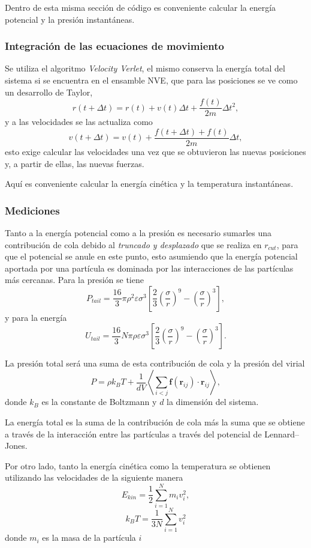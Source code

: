 \documentclass[a4paper,spanish,12pt,twoside]{article}
\begin{document}
Dentro de esta misma sección de código es conveniente calcular la energía potencial y la presión instantáneas. 

\subsubsection{Integración de las ecuaciones de movimiento}

Se utiliza el algoritmo \textit{Velocity Verlet}, el mismo conserva la energía total del sistema si se encuentra en el ensamble NVE, que para las posiciones se ve como un desarrollo de Taylor,
$$
r(t + \Delta t) = r(t) + v(t) \Delta t + \frac{f(t)}{2m} \Delta t^2,
$$
y a las velocidades se las actualiza como
$$
v(t + \Delta t) = v(t) + \frac{f(t + \Delta t) + f(t)}{2m} \Delta t,
$$
esto exige calcular las velocidades una vez que se obtuvieron las nuevas posiciones y, a partir de ellas, las nuevas fuerzas.

Aquí es conveniente calcular la energía cinética y la temperatura instantáneas.

\subsubsection{Mediciones}

Tanto a la energía potencial como a la presión es necesario sumarles una contribución de cola debido al \textit{truncado y desplazado} que se realiza en $r_{cut}$, para que el potencial se anule en este punto, esto asumiendo que la energía potencial aportada por una partícula es dominada por las interacciones de las partículas más cercanas. Para la presión se tiene
$$
P_{tail} = \frac{16}{3}\pi\rho^2\varepsilon\sigma^3 \left[ \frac{2}{3}\left( \frac{\sigma}{r} \right)^9 - \left( \frac{\sigma}{r} \right)^3 \right],
$$
y para la energía
$$
U_{tail} = \frac{16}{3}N\pi\rho\varepsilon\sigma^3 \left[ \frac{2}{3}\left( \frac{\sigma}{r} \right)^9 - \left( \frac{\sigma}{r} \right)^3 \right].
$$

La presión total será una suma de esta contribución de cola y la presión del virial
$$
P = \rho k_BT + \frac{1}{dV} \left\langle \sum_{i<j} \mathbf{f}(\mathbf{r}_{ij}) \cdot \mathbf{r}_{ij} \right\rangle,
$$
donde $k_B$ es la constante de Boltzmann y $d$ la dimensión del sistema.

La energía total es la suma de la contribución de cola más la suma que se obtiene a través de la interacción entre las partículas a través del potencial de Lennard--Jones.

Por otro lado, tanto la energía cinética como la temperatura se obtienen utilizando las velocidades de la siguiente manera
$$
E_{kin} = \frac{1}{2} \sum_{i=1}^N m_i v_i^2,
$$
$$
k_BT = \frac{1}{3N} \sum_{i=1}^{N} v_i^2
$$
donde $m_i$ es la masa de la partícula $i$
\end{document}

